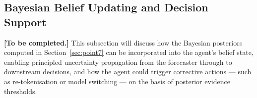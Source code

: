 \subsection{Bayesian Belief Updating and Decision Support}

\noindent\textbf{[To be completed.]}
This subsection will discuss how the Bayesian posteriors computed in Section~\ref{sec:point7} can be incorporated into the agent's belief state, enabling principled uncertainty propagation from the forecaster through to downstream decisions, and how the agent could trigger corrective actions — such as re-tokenisation or model switching — on the basis of posterior evidence thresholds.
